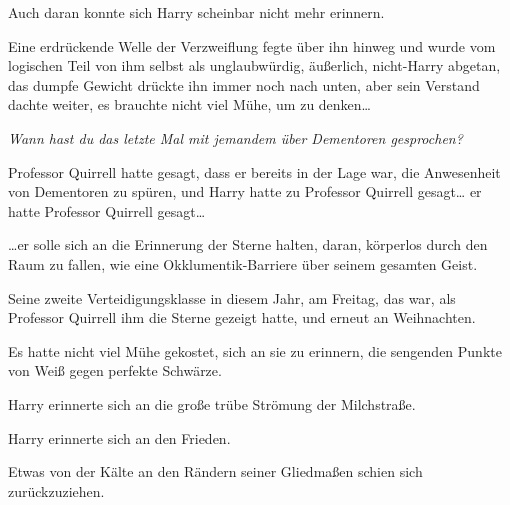 Auch daran konnte sich Harry scheinbar nicht mehr erinnern.

Eine erdrückende Welle der Verzweiflung fegte über ihn hinweg und wurde vom logischen Teil von ihm selbst als unglaubwürdig, äußerlich, nicht-Harry abgetan, das dumpfe Gewicht drückte ihn immer noch nach unten, aber sein Verstand dachte weiter, es brauchte nicht viel Mühe, um zu denken…

\emph{Wann hast du das letzte Mal mit jemandem über Dementoren gesprochen?}

Professor Quirrell hatte gesagt, dass er bereits in der Lage war, die Anwesenheit von Dementoren zu spüren, und Harry hatte zu Professor Quirrell gesagt… er hatte Professor Quirrell gesagt…

…er solle sich an die Erinnerung der Sterne halten, daran, körperlos durch den Raum zu fallen, wie eine Okklumentik-Barriere über seinem gesamten Geist.

Seine zweite Verteidigungsklasse in diesem Jahr, am Freitag, das war, als Professor Quirrell ihm die Sterne gezeigt hatte, und erneut an Weihnachten.

Es hatte nicht viel Mühe gekostet, sich an sie zu erinnern, die sengenden Punkte von Weiß gegen perfekte Schwärze.

Harry erinnerte sich an die große trübe Strömung der Milchstraße.

Harry erinnerte sich an den Frieden.

Etwas von der Kälte an den Rändern seiner Gliedmaßen schien sich zurückzuziehen.

